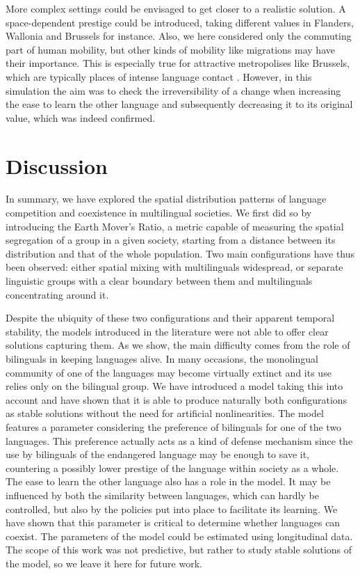\documentclass[../thesis.tex]{subfiles}
\begin{document}
More complex settings could be envisaged to get closer to a realistic solution. A
space-dependent prestige could be introduced, taking different values in Flanders,
Wallonia and Brussels for instance. Also, we here considered only the commuting part of
human mobility, but other kinds of mobility like migrations may have their importance.
This is especially true for attractive metropolises like Brussels, which are typically
places of intense language contact \cite{SimonCitiesTranslation2011}. However, in this
simulation the aim was to check the irreversibility of a change when increasing the ease
to learn the other language and subsequently decreasing it to its original value, which
was indeed confirmed. 



\section{Discussion}
In summary, we have explored the spatial distribution patterns of language competition
and coexistence in multilingual societies. We first did so by introducing the Earth
Mover's Ratio, a metric capable of measuring the spatial segregation of a group in a
given society, starting from a distance between its distribution and that of the whole
population. Two main configurations have thus been observed: either spatial mixing with
multilinguals widespread, or separate linguistic groups with a clear boundary between
them and multilinguals concentrating around it. 

Despite the ubiquity of these two configurations and their apparent temporal stability,
the models introduced in the literature were not able to offer clear solutions capturing
them. As we show, the main difficulty comes from the role of bilinguals in keeping
languages alive. In many occasions, the monolingual community of one of the languages
may become virtually extinct and its use relies only on the bilingual group. We have
introduced a model taking this into account and have shown that it is able to produce
naturally both configurations as stable solutions without the need for artificial
nonlinearities. The model features a parameter considering the preference of bilinguals
for one of the two languages. This preference actually acts as a kind of defense
mechanism since the use by bilinguals of the endangered language may be enough to save
it, countering a possibly lower prestige of the language within society as a whole. The
ease to learn the other language also has a role in the model. It may be influenced by
both the similarity between languages, which can hardly be controlled, but also by the
policies put into place to facilitate its learning. We have shown that this parameter is
critical to determine whether languages can coexist. The parameters of the model could
be estimated using longitudinal data. The scope of this work was not predictive, but
rather to study stable solutions of the model, so we leave it here for future work.
\end{document}
